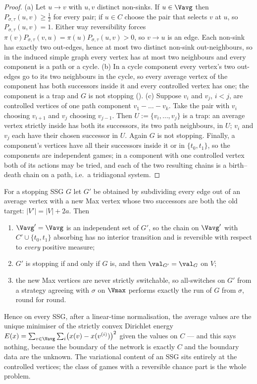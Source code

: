 \begin{proof}
(a) Let $u\to v$ with $u,v$ distinct non-sinks. If $u\in\Vavg$ then
$P_{\sigma,\tau}(u,v)\ge\tfrac12$ for every pair; if $u\in C$ choose the
pair that selects $v$ at $u$, so $P_{\sigma,\tau}(u,v)=1$. Either way
reversibility forces $\pi(v)P_{\sigma,\tau}(v,u)=\pi(u)P_{\sigma,\tau}(u,v)>0$,
so $v\to u$ is an edge. Each non-sink has exactly two out-edges, hence at
most two distinct non-sink out-neighbours, so in the induced simple graph
every vertex has at most two neighbours and every component is a path or a
cycle.
(b) In a cycle component every vertex's two out-edges go to its two
neighbours in the cycle, so every average vertex of the component has both
successors inside it and every controlled vertex has one; the component is a
trap and $G$ is not stopping ().
(c) Suppose $v_i$ and $v_j$, $i<j$, are controlled vertices of one path
component $v_1-\dots-v_k$. Take the pair with $v_i$ choosing $v_{i+1}$ and
$v_j$ choosing $v_{j-1}$. Then $U:=\{v_i,\dots,v_j\}$ is a trap: an average
vertex strictly inside has both its successors, its two path neighbours,
in $U$; $v_i$ and $v_j$ each have their chosen successor in $U$. Again $G$
is not stopping.
Finally, a component's vertices have all their successors inside it or in
$\{t_0,t_1\}$, so the components are independent games; in a component with
one controlled vertex both of its actions may be tried, and each of the two
resulting chains is a birth--death chain on a path, i.e.\ a tridiagonal
system.
\end{proof}

\begin{theorem}\label{vr:rev-vacuous}
For a stopping SSG $G$ let $G'$ be obtained by subdividing every edge out of
an average vertex with a new Max vertex whose two successors are both the
old target: $|V'|=|V|+2a$. Then
\begin{enumerate}[label=(\alph*),leftmargin=2.2em]
\item $\Vavg'=\Vavg$ is an independent set of $G'$, so the chain on
      $\Vavg'$ with $C'\cup\{t_0,t_1\}$ absorbing has no interior
      transition and is reversible with respect to \emph{every} positive
      measure;
\item $G'$ is stopping if and only if $G$ is, and then
      $\val_{G'}=\val_G$ on $V$;
\item the new Max vertices are never strictly switchable, so all-switches on
      $G'$ from a strategy agreeing with $\sigma$ on $\Vmax$ performs
      exactly the run of $G$ from $\sigma$, round for round.
\end{enumerate}
Hence on every SSG, after a linear-time normalisation, the average values
are the unique minimiser of the strictly convex Dirichlet energy
$E(x)=\sum_{v\in\Vavg}\sum_{i}\bigl(x(v)-x(v^{(i)})\bigr)^{2}$ given the
values on $C$ --- and this says nothing, because the boundary of the network
is exactly $C$ and the boundary data are the unknown. The variational
content of an SSG sits entirely at the controlled vertices; the class of
games with a reversible chance part is the whole problem.
\end{theorem}

